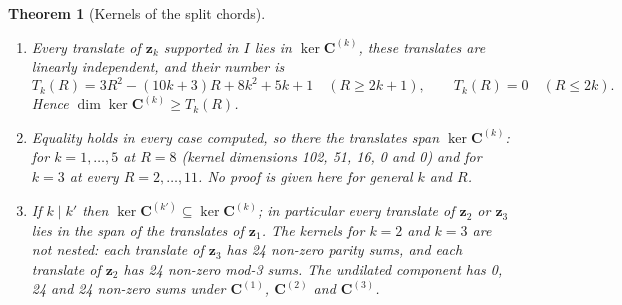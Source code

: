 \documentclass[11pt,a4paper]{article}
\newtheorem{theorem}{Theorem}[section]
\theoremstyle{definition}
\theoremstyle{remark}
\begin{document}
\begin{theorem}[Kernels of the split chords]\label{thm:splitker}
\begin{enumerate}
\item Every translate of $\mathbf{z}_k$ supported in $I$ lies in $\ker\mathbf{C}^{(k)}$, these translates are linearly independent, and their number is
\begin{equation}\label{eq:Tk}
T_k(R) = 3R^2-(10k+3)R+8k^2+5k+1\quad(R\ge 2k+1),\qquad T_k(R) = 0\quad(R\le 2k).
\end{equation}
Hence $\dim\ker\mathbf{C}^{(k)}\ge T_k(R)$.
\item Equality holds in every case computed, so there the translates span $\ker\mathbf{C}^{(k)}$: for $k = 1,\dots,5$ at $R = 8$ (kernel dimensions 102, 51, 16, 0 and 0) and for $k = 3$ at every $R = 2,\dots,11$. No proof is given here for general $k$ and $R$.
\item If $k\mid k'$ then $\ker\mathbf{C}^{(k')}\subseteq\ker\mathbf{C}^{(k)}$; in particular every translate of $\mathbf{z}_2$ or $\mathbf{z}_3$ lies in the span of the translates of $\mathbf{z}_1$. The kernels for $k = 2$ and $k = 3$ are not nested: each translate of $\mathbf{z}_3$ has 24 non-zero parity sums, and each translate of $\mathbf{z}_2$ has 24 non-zero mod-3 sums. The undilated component has 0, 24 and 24 non-zero sums under $\mathbf{C}^{(1)}$, $\mathbf{C}^{(2)}$ and $\mathbf{C}^{(3)}$.
\end{enumerate}
\end{theorem}
\end{document}
